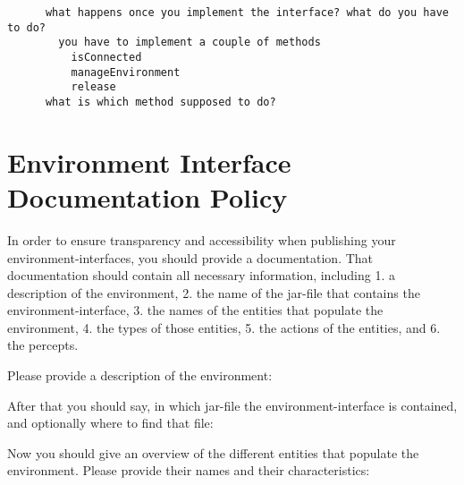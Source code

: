 \documentclass[a4]{article}
\begin{document}
\begin{verbatim}
      what happens once you implement the interface? what do you have to do?
        you have to implement a couple of methods
          isConnected
          manageEnvironment
          release
      what is which method supposed to do?
\end{verbatim}

\section{Environment Interface Documentation Policy}

In order to ensure transparency and accessibility when publishing your environment-interfaces, you should
provide a documentation. That documentation should contain all necessary information, including 
1. a description of the environment, 
2. the name of the jar-file that contains the environment-interface,
3. the names of the entities that populate the environment,
4. the types of those entities,
5. the actions of the entities, and
6. the percepts.

Please provide a description of the environment:\smallskip\\
\medskip

After that you should say, in which jar-file the environment-interface is contained, and optionally where to find that file:\smallskip\\
\medskip

Now you should give an overview of the different entities that populate the environment. Please provide their names
and their characteristics:\smallskip\\
\medskip
\end{document}
